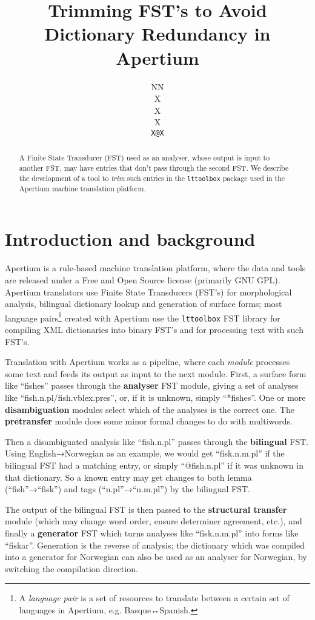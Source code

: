 \documentclass[11pt]{article}
\author{NN\\  X \\ X \\  X \\  {\tt \small   X@X}}
\title{Trimming FST's to Avoid Dictionary Redundancy in Apertium} %
\begin{document}
\maketitle

\begin{abstract}
  A Finite State Transducer (FST) used as an analyser, whose output is
  input to another FST, may have entries that don't pass through the
  second FST. We describe the development of a tool to \emph{trim}
  such entries in the \texttt{lttoolbox} package used in the Apertium
  machine translation platform.
\end{abstract}

\section{Introduction and background}

Apertium is a rule-based machine translation platform, where the data
and tools are released under a Free and Open Source license (primarily
GNU GPL). Apertium translators use Finite State Transducers (FST's)
for morphological analysis, bilingual dictionary lookup and generation
of surface forms; most language pairs\footnote{A \emph{language pair}
  is a set of resources to translate between a certain set of
  languages in Apertium, e.g. Basque↔Spanish.} created with Apertium
use the \texttt{lttoolbox} FST library for compiling XML dictionaries
into binary FST's and for processing text with such FST's.


Translation with Apertium works as a pipeline, where each
\emph{module} processes some text and feeds its output as input to the
next module. First, a surface form like ``fishes'' passes through the
\textbf{analyser} FST module, giving a set of analyses like
``fish.n.pl/fish.vblex.pres'', or, if it is unknown, simply
``*fishes''. One or more \textbf{disambiguation} modules select which
of the analyses is the correct one. The \textbf{pretransfer} module
does some minor formal changes to do with multiwords.

Then a disambiguated analysis like ``fish.n.pl'' passes through the
\textbf{bilingual} FST. Using English→Norwegian as an example, we
would get ``fisk.n.m.pl'' if the bilingual FST had a matching entry,
or simply ``@fish.n.pl'' if it was unknown in that dictionary. So a
known entry may get changes to both lemma (``fish''→``fisk'') and tags
(``n.pl''→``n.m.pl'') by the bilingual FST.

The output of the bilingual FST is then passed to the
\textbf{structural transfer} module (which may change word order,
ensure determiner agreement, etc.), and finally a \textbf{generator}
FST which turns analyses like ``fisk.n.m.pl'' into forms like
``fiskar''. Generation is the reverse of analysis; the dictionary
which was compiled into a generator for Norwegian can also be used as
an analyser for Norwegian, by switching the compilation direction.
\end{document}
